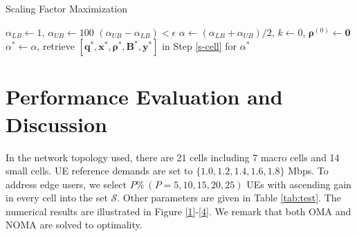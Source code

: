 \documentclass[10pt,journal,final,finalsubmission,twocolumn]{IEEEtran}
\begin{document}
\begin{algorithm}[tbp]\label{al2}
\caption{Scaling Factor Maximization} 
$\alpha_{LB}\leftarrow 1$, $\alpha_{UB}\leftarrow 100$\;
\Repeat 
{$(\alpha _{UB}- \alpha_{LB})<\epsilon$}
{$\alpha \leftarrow (\alpha_{LB}+\alpha_{UB})/{2}$, $k\leftarrow0$, $\boldsymbol{\rho}^{(0)}\leftarrow \boldsymbol{0}$\;
}  
$\alpha^*\leftarrow \alpha$, retrieve $[\boldsymbol{q}^*,\boldsymbol{x}^*,\boldsymbol{\rho}^*, \boldsymbol{B}^*,\boldsymbol{y}^*]$ in Step \ref{s-cell} for $\alpha^*$\;
\;
\end{algorithm} 



\section{Performance Evaluation and Discussion}\label{Sec:PerformanceEvaluationDiscussions}

In the network topology used, there are 21 cells including 7 macro cells and 14 small cells. UE reference demands are set to $\{1.0, 1.2, 1.4, 1.6, 1.8\}$ Mbps. To address edge users, we select $P\%\ (P=5, 10, 15, 20, 25)$ UEs with ascending gain in every cell into the set $\mathcal{S}$. Other parameters are given in Table \ref{tab:test}. The numerical results are illustrated in Figure \ref{1}-\ref{4}. We remark that both OMA and NOMA are solved to optimality.
\end{document}
